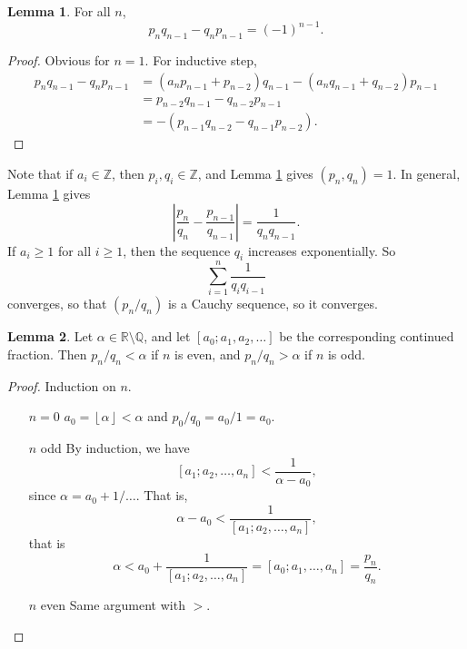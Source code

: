 \documentclass{article}
\newcommand{\Z}{\mathbb{Z}}
\newcommand{\Q}{\mathbb{Q}}
\newcommand{\R}{\mathbb{R}}
\newcommand{\rb}[1]{\left( #1 \right)}
\renewcommand{\sb}[1]{\left[ #1 \right]}
\newcommand{\abs}[1]{\left\lvert #1 \right\rvert}
\newcommand{\fb}[1]{\left\lfloor #1 \right\rfloor}
\theoremstyle{definition}\newtheorem{definition}{Definition}
\theoremstyle{definition}\newtheorem{remark}[definition]{Remark}
\theoremstyle{definition}\newtheorem*{example}{Example}
\theoremstyle{definition}\newtheorem*{note}{Note}
\newtheorem{lemma}[definition]{Lemma}
\begin{document}
\begin{lemma}
\label{lem:69}
For all $ n $,
$$ p_nq_{n - 1} - q_np_{n - 1} = \rb{-1}^{n - 1}. $$
\end{lemma}

\begin{proof}
Obvious for $ n = 1 $. For inductive step,
\begin{align*}
p_nq_{n - 1} - q_np_{n - 1}
& = \rb{a_np_{n - 1} + p_{n - 2}}q_{n - 1} - \rb{a_nq_{n - 1} + q_{n - 2}}p_{n - 1} \\
& = p_{n - 2}q_{n - 1} - q_{n - 2}p_{n - 1} \\
& = -\rb{p_{n - 1}q_{n - 2} - q_{n - 1}p_{n - 2}}.
\end{align*}
\end{proof}

Note that if $ a_i \in \Z $, then $ p_i, q_i \in \Z $, and Lemma \ref{lem:69} gives $ \rb{p_n, q_n} = 1 $. In general, Lemma \ref{lem:69} gives
$$ \abs{\dfrac{p_n}{q_n} - \dfrac{p_{n - 1}}{q_{n - 1}}} = \dfrac{1}{q_nq_{n - 1}}. $$
If $ a_i \ge 1 $ for all $ i \ge 1 $, then the sequence $ q_i $ increases exponentially. So
$$ \sum_{i = 1}^n \dfrac{1}{q_iq_{i - 1}} $$
converges, so that $ \rb{p_n / q_n} $ is a Cauchy sequence, so it converges.


\begin{lemma}
\label{lem:70}
Let $ \alpha \in \R \setminus \Q $, and let $ \sb{a_0; a_1, a_2, \dots} $ be the corresponding continued fraction. Then $ p_n / q_n < \alpha $ if $ n $ is even, and $ p_n / q_n > \alpha $ if $ n $ is odd.
\end{lemma}

\begin{proof}
Induction on $ n $.
\begin{itemize}[leftmargin=0.5in]
\item[$ n = 0 $] $ a_0 = \fb{\alpha} < \alpha $ and $ p_0 / q_0 = a_0 / 1 = a_0 $.
\item[$ n $ odd] By induction, we have
$$ \sb{a_1; a_2, \dots, a_n} < \dfrac{1}{\alpha - a_0}, $$
since $ \alpha = a_0 + 1 / \dots $. That is,
$$ \alpha - a_0 < \dfrac{1}{\sb{a_1; a_2, \dots, a_n}}, $$
that is
$$ \alpha < a_0 + \dfrac{1}{\sb{a_1; a_2, \dots, a_n}} = \sb{a_0; a_1, \dots, a_n} = \dfrac{p_n}{q_n}. $$
\item[$ n $ even] Same argument with $ > $.
\end{itemize}
\end{proof}
\end{document}
